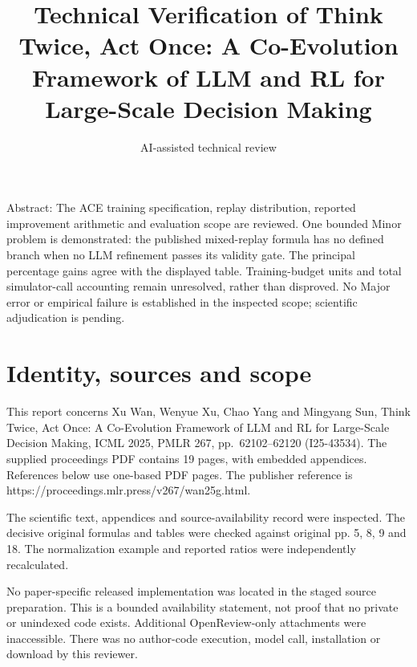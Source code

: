 \documentclass[10pt]{article}
\title{Technical Verification of Think Twice, Act Once: A Co-Evolution Framework of LLM and RL for Large-Scale Decision Making}
\author{AI-assisted technical review}
\date{}
\begin{document}
\maketitle
Abstract: The ACE training specification, replay distribution, reported improvement arithmetic and evaluation scope are reviewed. One bounded Minor problem is demonstrated: the published mixed-replay formula has no defined branch when no LLM refinement passes its validity gate. The principal percentage gains agree with the displayed table. Training-budget units and total simulator-call accounting remain unresolved, rather than disproved. No Major error or empirical failure is established in the inspected scope; scientific adjudication is pending.\par
\section*{Identity, sources and scope}
This report concerns Xu Wan, Wenyue Xu, Chao Yang and Mingyang Sun, Think Twice, Act Once: A Co-Evolution Framework of LLM and RL for Large-Scale Decision Making, ICML 2025, PMLR 267, pp. 62102–62120 (I25-43534). The supplied proceedings PDF contains 19 pages, with embedded appendices. References below use one-based PDF pages. The publisher reference is https://proceedings.mlr.press/v267/wan25g.html.\par
The scientific text, appendices and source-availability record were inspected. The decisive original formulas and tables were checked against original pp. 5, 8, 9 and 18. The normalization example and reported ratios were independently recalculated.\par
No paper-specific released implementation was located in the staged source preparation. This is a bounded availability statement, not proof that no private or unindexed code exists. Additional OpenReview-only attachments were inaccessible. There was no author-code execution, model call, installation or download by this reviewer.\par
\end{document}

